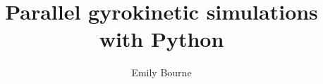 \documentclass[a4paper,10pt,openany]{book}
\title{Parallel gyrokinetic simulations with Python}
\author{Emily Bourne}
\begin{document}
\frontmatter 

\maketitle

\tableofcontents

\mainmatter















%

{}
\end{document}
